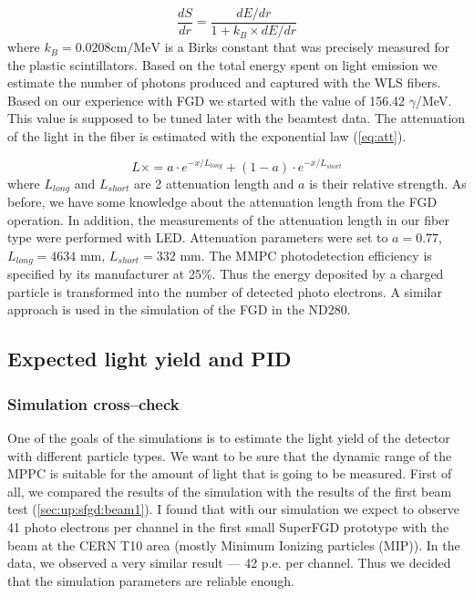 \documentclass[main.tex]{subfiles}
\begin{document}
\begin{equation}
\frac{dS}{dr}=\frac{dE/dr}{1+k_B\times dE/dr}
\end{equation}
where $k_B=0.0208\text{cm/MeV}$ is a Birks constant that was precisely measured for the plastic scintillators. Based on the total energy spent on light emission we estimate the number of photons produced and captured with the WLS fibers. Based on our experience with FGD we started with the value of 156.42 $\gamma$/MeV. This value is supposed to be tuned later with the beamtest data. The attenuation of the light in the fiber is estimated with the exponential law (\autoref{eq:att}).

\begin{equation}
\label{eq:att}
L\times=a\cdot e^{-x/L_{long}}+(1-a)\cdot e^{-x/L_{short}}
\end{equation}
where $L_{long}$ and $L_{short}$ are 2 attenuation length and $a$ is their relative strength. As before, we have some knowledge about the attenuation length from the FGD operation. In addition, the measurements of the attenuation length in our fiber type were performed with LED. Attenuation parameters were set to $a=0.77$, $L_{long}=4634$ mm, $L_{short}=332$ mm. The MMPC photodetection efficiency is specified by its manufacturer at 25\%. Thus the energy deposited by a charged particle is transformed into the number of detected photo electrons. A similar approach is used in the simulation of the FGD in the ND280.

\subsection{Expected light yield and PID}
\subsubsection{Simulation cross--check}
One of the goals of the simulations is to estimate the light yield of the detector with different particle types. We want to be sure that the dynamic range of the MPPC is suitable for the amount of light that is going to be measured. First of all, we compared the results of the simulation with the results of the first beam test (\autoref{sec:up:sfgd:beam1}). I found that with our simulation we expect to observe 41 photo electrons per channel in the first small SuperFGD prototype with the beam at the CERN T10 area (mostly Minimum Ionizing particles (MIP)). In the data, we observed a very similar result --- 42 p.e. per channel. Thus we decided that the simulation parameters are reliable enough.
\end{document}
